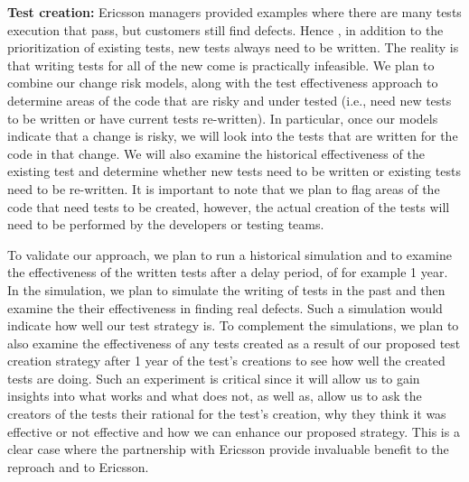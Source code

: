\textbf{Test creation:} Ericsson managers provided examples where there are many tests execution that pass, but customers still find defects. Hence , in addition to the prioritization of existing tests, new tests always need to be written. The reality is that writing tests for all of the new come is practically infeasible. We plan to combine our change risk models, along with the test effectiveness approach to determine areas of the code that are risky and under tested (i.e., need new tests to be written or have current tests re-written). In particular, once our models indicate that a change is risky, we will look into the tests that are written for the code in that change. We will also examine the historical effectiveness of the existing test and determine whether new tests need to be written or existing tests need to be re-written. It is important to note that we plan to flag areas of the code that need tests to be created, however, the actual creation of the tests will need to be performed by the developers or testing teams.

To validate our approach, we plan to run a historical simulation and to examine the effectiveness of the written tests after a delay period, of for example 1 year. In the simulation, we plan to simulate the writing of tests in the past and then examine the their effectiveness in finding real defects. Such a simulation would indicate how well our test strategy is. To complement the simulations, we plan to also examine the effectiveness of any tests created as a result of our proposed test creation strategy after 1 year of the test's creations to see how well the created tests are doing. Such an experiment is critical since it will allow us to gain insights into what works and what does not, as well as, allow us to ask the creators of the tests their rational for the test's creation, why they think it was effective or not effective and how we can enhance our proposed strategy. This is a clear case where the partnership with Ericsson provide invaluable benefit to the reproach and to Ericsson.



